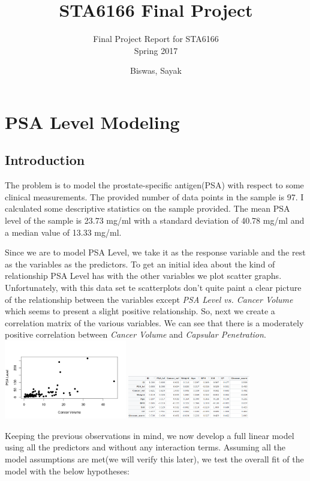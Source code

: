 \documentclass{scrartcl}
\begin{document}
\title{STA6166 Final Project}
\author{Biswas, Sayak}
\subtitle{Final Project Report for STA6166\\Spring 2017}
\maketitle
\section{PSA Level Modeling}
\subsection{Introduction}
\par
The problem is to model the prostate-specific antigen(PSA) with respect to some clinical measurements. The provided number of data points in the sample is 97. I calculated some descriptive statistics on the sample provided. The mean PSA level of the sample is 23.73 mg/ml with a standard deviation of 40.78 mg/ml and a median value of 13.33 mg/ml.
\par
Since we are to model PSA Level, we take it as the response variable and the rest as the variables as the predictors. To get an initial idea about the kind of relationship PSA Level has with the other variables we plot scatter graphs. Unfortunately, with this data set te scatterplots don't quite paint a clear picture of the relationship between the variables except \textit{PSA Level vs. Cancer Volume} which seems to present a slight positive relationship. So, next we create a correlation matrix of the various variables. We can see that there is a moderately positive correlation between \textit{Cancer Volume} and \textit{Capsular Penetration}.
\includegraphics[width=0.4\textwidth]{psa_cancervol.png}
\includegraphics[width=0.4\textwidth]{Correlation_Matrix.png}
\par
Keeping the previous observations in mind, we now develop a full linear model using all the predictors and without any interaction terms. Assuming all the model assumptions are met(we will verify this later), we test the overall fit of the model with the below hypotheses:\\
\end{document}
